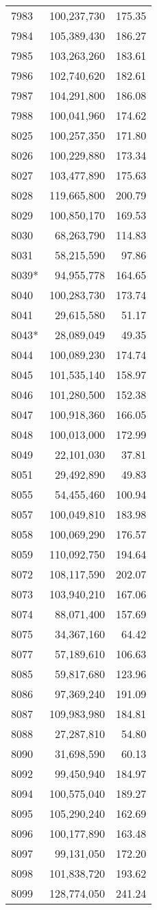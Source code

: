 \documentclass[11pt]{article}
\begin{document}
\begin{longtable}[!hbtp]{l r r}
7983	&	100,237,730	&	175.35	\\
7984	&	105,389,430	&	186.27	\\
7985	&	103,263,260	&	183.61	\\
7986	&	102,740,620	&	182.61	\\
7987	&	104,291,800	&	186.08	\\
7988	&	100,041,960	&	174.62	\\
8025	&	100,257,350	&	171.80	\\
8026	&	100,229,880	&	173.34	\\
8027	&	103,477,890	&	175.63	\\
8028	&	119,665,800	&	200.79	\\
8029	&	100,850,170	&	169.53	\\
8030	&	68,263,790	&	114.83	\\
8031	&	58,215,590	&	97.86	\\
8039*	&	94,955,778	&	164.65	\\
8040	&	100,283,730	&	173.74	\\
8041	&	29,615,580	&	51.17	\\
8043*	&	28,089,049	&	49.35	\\
8044	&	100,089,230	&	174.74	\\
8045	&	101,535,140	&	158.97	\\
8046	&	101,280,500	&	152.38	\\
8047	&	100,918,360	&	166.05	\\
8048	&	100,013,000	&	172.99	\\
8049	&	22,101,030	&	37.81	\\
8051	&	29,492,890	&	49.83	\\
8055	&	54,455,460	&	100.94	\\
8057	&	100,049,810	&	183.98	\\
8058	&	100,069,290	&	176.57	\\
8059	&	110,092,750	&	194.64	\\
8072	&	108,117,590	&	202.07	\\
8073	&	103,940,210	&	167.06	\\
8074	&	88,071,400	&	157.69	\\
8075	&	34,367,160	&	64.42	\\
8077	&	57,189,610	&	106.63	\\
8085	&	59,817,680	&	123.96	\\
8086	&	97,369,240	&	191.09	\\
8087	&	109,983,980	&	184.81	\\
8088	&	27,287,810	&	54.80	\\
8090	&	31,698,590	&	60.13	\\
8092	&	99,450,940	&	184.97	\\
8094	&	100,575,040	&	189.27	\\
8095	&	105,290,240	&	162.69	\\
8096	&	100,177,890	&	163.48	\\
8097	&	99,131,050	&	172.20	\\
8098	&	101,838,720	&	193.62	\\
8099	&	128,774,050	&	241.24	\\


\end{longtable}
\end{document}
